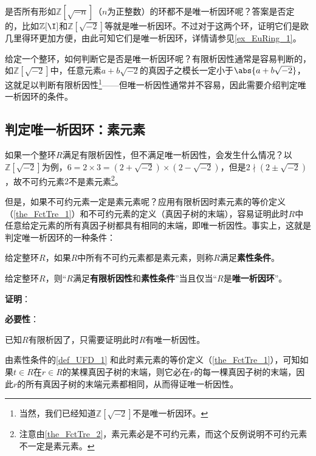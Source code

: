 是否所有形如$\mathbb{Z}[\sqrt{-n}]$（$n$为正整数）的环都不是唯一析因环呢？答案是否定的，比如$\mathbb{Z}[\I]$和$\mathbb{Z}[\sqrt{-2}]$等就是唯一析因环。不过对于这两个环，证明它们是欧几里得环更加方便，由此可知它们是唯一析因环，详情请参见\autoref{ex_EuRing_1}。



给定一个整环，如何判断它是否是唯一析因环呢？有限析因性通常是容易判断的，如$\mathbb{Z}[\sqrt{-2}]$中，任意元素$a+b\sqrt{-2}$的真因子之模长一定小于$\abs{a+b\sqrt{-2}}$，这就足以判断有限析因性\footnote{当然，我们已经知道$\mathbb{Z}[\sqrt{-2}]$不是唯一析因环。}——但唯一析因性通常并不容易，因此需要介绍判定唯一析因环的条件。




\subsection{判定唯一析因环：素元素}



如果一个整环$R$满足有限析因性，但不满足唯一析因性，会发生什么情况？以$\mathbb{Z}[\sqrt{-2}]$为例，$6=2\times 3=(2+\sqrt{-2})\times(2-\sqrt{-2})$，但是$2\nmid(2\pm\sqrt{-2})$，故不可约元素$2$不是素元素\footnote{注意由\autoref{the_FctTre_2}，素元素必是不可约元素，而这个反例说明不可约元素不一定是素元素。}。

但是，如果不可约元素一定是素元素呢？应用有限析因时素元素的等价定义（\autoref{the_FctTre_1}）和不可约元素的定义（真因子树的末端），容易证明此时$R$中任意给定元素的所有真因子树都具有相同的末端，即唯一析因性。事实上，这就是判定唯一析因环的一种条件：



\begin{definition}{}\label{def_UFD_1}
给定整环$R$，如果$R$中所有不可约元素都是素元素，则称$R$满足\textbf{素性条件}。
\end{definition}


\begin{theorem}{}

给定整环$R$，则“$R$满足\textbf{有限析因性}和\textbf{素性条件}”当且仅当“$R$是\textbf{唯一析因环}”。

\end{theorem}


\textbf{证明}：

\textbf{必要性}：

已知$R$有限析因了，只需要证明此时$R$有唯一析因性。

由素性条件的\autoref{def_UFD_1}  和此时素元素的等价定义（\autoref{the_FctTre_1}），可知如果$t\in R$在$r\in R$的某棵真因子树的末端，则它必在$r$的每一棵真因子树的末端，因此$r$的所有真因子树的末端元素都相同，从而得证唯一析因性。

